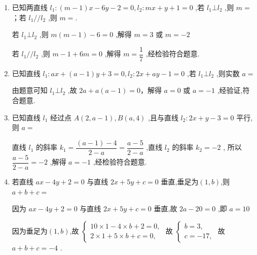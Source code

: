 \begin{enumerate}
\begin{enumerate}
        \item 已知两直线 ${l}_{1} : \left( {m - 1}\right) x - {6y} - 2 = 0,{l}_{2} : {mx} + y + 1 = 0$ ,若 ${l}_{1} \bot  {l}_{2}$ ,则 $m =$；若 ${l}_{1}//{l}_{2}$ ,则 $m =$.
        \begin{jieda}
            若 ${l}_{1} \bot  {l}_{2}$ ,则 $m\left( {m - 1}\right)  - 6 = 0$ ,解得 $m = 3$ 或 $m =  - 2$ 
            
            若 ${l}_{1}//{l}_{2}$ ,则 $m - 1 + {6m} = 0$ ,解得 $m = \dfrac{1}{7}$ ,经检验符合题意.
        \end{jieda}
        
        \item 已知直线 ${l}_{1} : {ax} + \left( {a - 1}\right) y + 3 = 0,{l}_{2} : {2x} + {ay} - 1 = 0$ ,若 ${l}_{1}\bot {l}_{2}$ ,则实数 $a = $
        \begin{jieda}
            由题意可知 ${l}_{1} \bot  {l}_{2}$ ,故 ${2a} + a\left( {a - 1}\right)  = 0$，解得 $a = 0$ 或 $a =  - 1$ ,经验证,符合题意.
        \end{jieda}
        \item 已知直线 ${l}_{1}$ 经过点 $A\left( {2,a - 1}\right) ,B\left( {a,4}\right)$ ,且与直线 ${l}_{2} : {2x} + y - 3 = 0$ 平行,则 $a=$
        \begin{jieda}
            直线 ${l}_{1}$ 的斜率 ${k}_{1} = \dfrac{\left( {a - 1}\right)  - 4}{2 - a} = \dfrac{a - 5}{2 - a}$ ,直线 ${l}_{2}$ 的斜率 ${k}_{2} =  - 2$ ,
            所以 $\dfrac{a - 5}{2 - a} =  - 2$ ,解得 $a =  - 1$ ,经检验符合题意.
        \end{jieda}
        \item 若直线 ${ax} - {4y} + 2 = 0$ 与直线 ${2x} + {5y} + c = 0$ 垂直,垂足为$(1,b)$,则 $a + b + c = $
        \begin{jieda}
            因为 ${ax} - {4y} + 2 = 0$ 与直线 ${2x} + {5y} + c = 0$ 垂直,故 ${2a} - {20} = 0$ ,即 $a = {10}$ 
            
            因为垂足为$(1,b)$,故 $\left\{  {\begin{array}{l} {10} \times  1 - 4 \times  b + 2 = 0, \\  2 \times  1 + 5 \times  b + c = 0, \end{array}\text{ 故 }\left\{  \begin{array}{l} b = 3, \\  c =  - {17}, \end{array}\right. }\right.$
            故 $a + b + c =  - 4$ .
        \end{jieda}
        

\end{enumerate}
\end{enumerate}

